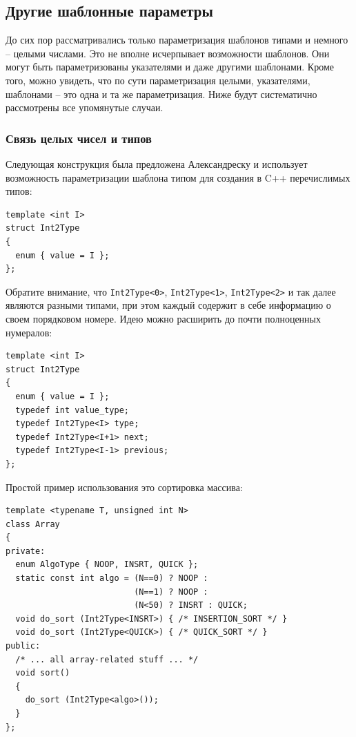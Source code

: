 \documentclass[a4paper,12pt,oneside]{article}
\begin{document}
\pagebreak
\subsection{Другие шаблонные параметры}

До сих пор рассматривались только параметризация шаблонов типами и немного -- целыми числами. Это не вполне исчерпывает возможности шаблонов. Они могут быть параметризованы указателями и даже другими шаблонами. Кроме того, можно увидеть, что по сути параметризация целыми, указателями, шаблонами -- это одна и та же параметризация. Ниже будут систематично рассмотрены все упомянутые случаи.

\subsubsection{Связь целых чисел и типов}\label{IntToype}

Следующая конструкция была предложена Александреску и использует возможность параметризации шаблона типом для создания в C++ перечислимых типов:

\begin{lstlisting}
template <int I>
struct Int2Type
{
  enum { value = I };
};
\end{lstlisting}

Обратите внимание, что \lstinline!Int2Type<0>!, \lstinline!Int2Type<1>!, \lstinline!Int2Type<2>! и так далее являются разными типами, при этом каждый содержит в себе информацию о своем порядковом номере. Идею можно расширить до почти полноценных нумералов:

\begin{lstlisting}
template <int I>
struct Int2Type
{
  enum { value = I };
  typedef int value_type;
  typedef Int2Type<I> type;
  typedef Int2Type<I+1> next;
  typedef Int2Type<I-1> previous;
};
\end{lstlisting}

Простой пример использования это сортировка массива:

\begin{lstlisting}
template <typename T, unsigned int N>
class Array 
{
private:
  enum AlgoType { NOOP, INSRT, QUICK };
  static const int algo = (N==0) ? NOOP : 
                          (N==1) ? NOOP :
                          (N<50) ? INSRT : QUICK;
  void do_sort (Int2Type<INSRT>) { /* INSERTION_SORT */ }
  void do_sort (Int2Type<QUICK>) { /* QUICK_SORT */ }
public:
  /* ... all array-related stuff ... */
  void sort()
  {
    do_sort (Int2Type<algo>());
  }
};
\end{lstlisting}
\end{document}
